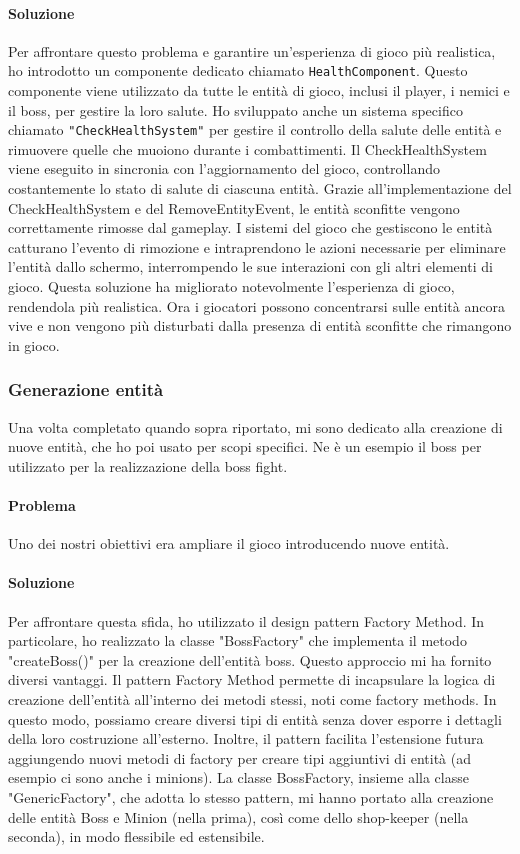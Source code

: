 \documentclass[a4paper,12pt]{report}
\begin{document}
\paragraph*{Soluzione}
Per affrontare questo problema e garantire un'esperienza di gioco più realistica, ho introdotto un componente dedicato chiamato \texttt{HealthComponent}. 
Questo componente viene utilizzato da tutte le entità di gioco, inclusi il player, i nemici e il boss, per gestire la loro salute.
Ho sviluppato anche un sistema specifico chiamato \texttt{"CheckHealthSystem"} per gestire il controllo della salute delle entità e rimuovere quelle che muoiono durante i combattimenti. 
Il CheckHealthSystem viene eseguito in sincronia con l'aggiornamento del gioco, controllando costantemente lo stato di salute di ciascuna entità.
Grazie all'implementazione del CheckHealthSystem e del RemoveEntityEvent, le entità sconfitte vengono correttamente rimosse dal gameplay.
I sistemi del gioco che gestiscono le entità catturano l'evento di rimozione e intraprendono le azioni necessarie per eliminare l'entità dallo schermo, interrompendo le sue interazioni con gli altri elementi di gioco.
Questa soluzione ha migliorato notevolmente l'esperienza di gioco, rendendola più realistica. 
Ora i giocatori possono concentrarsi sulle entità ancora vive e non vengono più disturbati dalla presenza di entità sconfitte che rimangono in gioco.
\subsubsection{Generazione entità}
Una volta completato quando sopra riportato, mi sono dedicato alla creazione di nuove entità, che ho poi usato per scopi specifici.
Ne è un esempio il boss per utilizzato per la realizzazione della boss fight.
\paragraph*{Problema}
Uno dei nostri obiettivi era ampliare il gioco introducendo nuove entità.
\paragraph*{Soluzione}
Per affrontare questa sfida, ho utilizzato il design pattern Factory Method.
In particolare, ho realizzato la classe "BossFactory" che implementa il metodo "createBoss()" per la creazione dell'entità boss.
Questo approccio mi ha fornito diversi vantaggi.
Il pattern Factory Method permette di incapsulare la logica di creazione dell'entità all'interno dei metodi stessi, noti come factory methods.
In questo modo, possiamo creare diversi tipi di entità senza dover esporre i dettagli della loro costruzione all'esterno.
Inoltre, il pattern facilita l'estensione futura aggiungendo nuovi metodi di factory per creare tipi aggiuntivi di entità (ad esempio ci sono anche i minions). 
La classe BossFactory, insieme alla classe "GenericFactory", che adotta lo stesso pattern, mi hanno portato alla creazione delle entità Boss e Minion (nella prima), così come dello shop-keeper (nella seconda), in modo flessibile ed estensibile.
\end{document}

